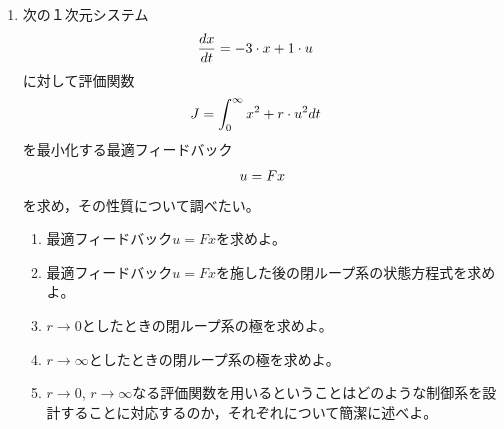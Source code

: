 \documentclass[a4paper, fleqn,twocolumn]{jbook}
\begin{document}
\begin{enumerate}

\begin{figure}[t]
\begin{center}
\underline{学籍番号：　　　　　　　　　　　}
\ \ \ \ \ \ 
\underline{氏名：　　　　　　　　　　　　　}
\end{center}
\end{figure}
\newpage

\item
次の１次元システム
\vspace{-1mm}
\begin{align}
	\frac{dx}{dt} &= -3 \cdot x + 1 \cdot u
\nonumber
\vspace{-4mm}
\end{align}
に対して評価関数
\vspace{-1mm}
\begin{align}
	J &= \int_0^\infty  x^2 + r \cdot u^2 dt
\nonumber
\vspace{-4mm}
\end{align}
を最小化する最適フィードバック
\vspace{-1mm}
\begin{align}
	u=Fx
\nonumber
\vspace{-4mm}
\end{align}
を求め，その性質について調べたい。
\vspace{-2mm}

\begin{enumerate}

\item
最適フィードバック$u=Fx$を求めよ。
\vspace{20cm}

\newpage

\item
最適フィードバック$u=Fx$を施した後の閉ループ系の状態方程式を求めよ。
\vspace{6cm}


\item
$r \rightarrow 0$としたときの閉ループ系の極を求めよ。
\vspace{3cm}

\item
$r \rightarrow \infty$としたときの閉ループ系の極を求めよ。
\vspace{3cm}

\item
$r \rightarrow 0$, $r \rightarrow \infty$なる評価関数を用いるということはどのような制御系を設計することに対応するのか，それぞれについて簡潔に述べよ。
\vspace{4cm}
\end{enumerate}





\end{enumerate}
\end{document}
